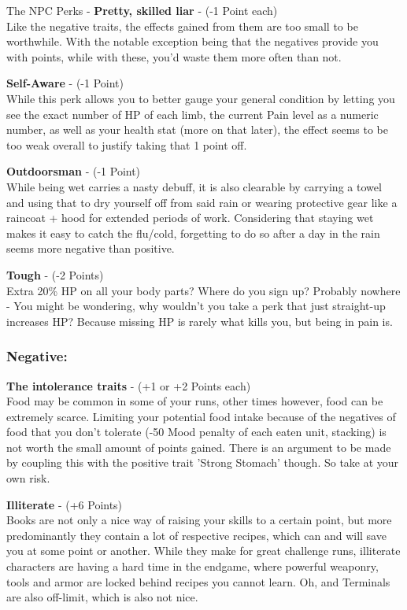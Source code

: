 The NPC Perks - \textbf{Pretty, skilled liar} - (-1 Point each)\\Like the negative traits, the effects gained from them are too small to be worthwhile. With the notable exception being that the negatives provide you with points, while with these, you'd waste them more often than not.

\textbf{Self-Aware} - (-1 Point)\\While this perk allows you to better gauge your general condition by letting you see the exact number of HP of each limb, the current Pain level as a numeric number, as well as your health stat (more on that later), the effect seems to be too weak overall to justify taking that 1 point off.

\textbf{Outdoorsman} - (-1 Point)\\While being wet carries a nasty debuff, it is also clearable by carrying a towel and using that to dry yourself off from said rain or wearing protective gear like a raincoat + hood for extended periods of work. Considering that staying wet makes it easy to catch the flu/cold, forgetting to do so after a day in the rain seems more negative than positive.

\textbf{Tough} - (-2 Points)\\Extra 20\% HP on all your body parts? Where do you sign up? Probably nowhere - You might be wondering, why wouldn't you take a perk that just straight-up increases HP? Because missing HP is rarely what kills you, but being in pain is.

\subsubsection{Negative:}

\textbf{The intolerance traits} - (+1 or +2 Points each)\\Food may be common in some of your runs, other times however, food can be extremely scarce. Limiting your potential food intake because of the negatives of food that you don't tolerate (-50 Mood penalty of each eaten unit, stacking) is not worth the small amount of points gained. There is an argument to be made by coupling this with the positive trait 'Strong Stomach' though. So take at your own risk.

\textbf{Illiterate} - (+6 Points)\\Books are not only a nice way of raising your skills to a certain point, but more predominantly they contain a lot of respective recipes, which can and will save you at some point or another. While they make for great challenge runs, illiterate characters are having a hard time in the endgame, where powerful weaponry, tools and armor are locked behind recipes you cannot learn. Oh, and Terminals are also off-limit, which is also not nice.

